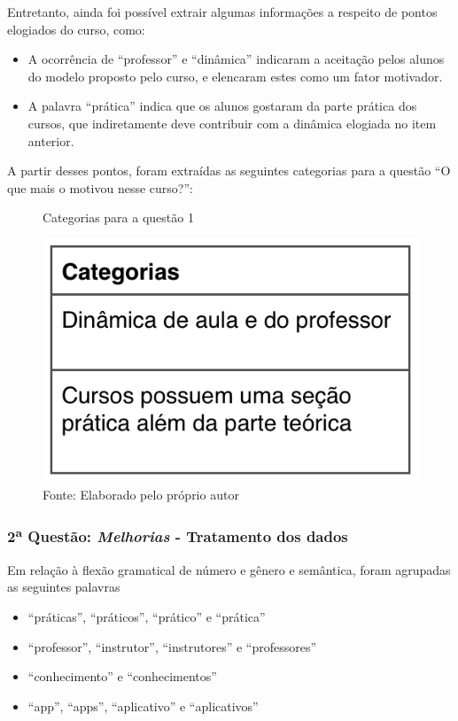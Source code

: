 Entretanto, ainda foi possível extrair algumas informações a respeito de pontos elogiados do curso, como:

\begin{itemize}
\item A ocorrência de \enquote{professor} e \enquote{dinâmica} indicaram a aceitação pelos alunos do modelo proposto pelo curso, e elencaram estes como um fator motivador.
\item A palavra \enquote{prática} indica que os alunos gostaram da parte prática dos cursos, que indiretamente deve contribuir com a dinâmica elogiada no item anterior.
\end{itemize}

A partir desses pontos, foram extraídas as seguintes categorias para a questão \enquote{O que mais o motivou nesse curso?}:

\begin{figure}[H]
\caption{Categorias para a questão 1}
\centerline{\includegraphics[scale=0.75]{img/categoriasmotivacao}}
\label{fig:categoriasmotivacao}
\caption* {Fonte: Elaborado pelo próprio autor}
\end{figure}

\pagebreak
\subsubsection*{2\textsuperscript{a} Questão: \textit{Melhorias} - Tratamento dos dados }

Em relação à flexão gramatical de número e gênero e semântica, foram agrupadas as seguintes palavras

\begin{itemize}
\item \enquote{práticas}, \enquote{práticos}, \enquote{prático} e \enquote{prática}
\item \enquote{professor}, \enquote{instrutor}, \enquote{instrutores} e \enquote{professores}
\item \enquote{conhecimento} e \enquote{conhecimentos}
\item \enquote{app}, \enquote{apps}, \enquote{aplicativo} e \enquote{aplicativos}
\end{itemize}

